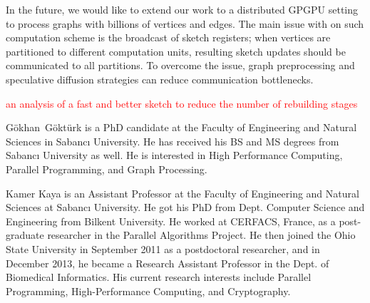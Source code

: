 \documentclass[10pt,journal,compsoc]{IEEEtran}
\newcommand\acro{{\sc{HyperFuseR\xspace}\xspace}\xspace}
\newcommand\kktodo[1]{\textcolor{red}{#1}}
\begin{document}
In the future, we would like to extend our work to a distributed GPGPU setting to process graphs with billions of vertices and edges. The main issue with \acro on such computation scheme is the broadcast of sketch registers; when vertices are partitioned to different computation units, resulting sketch updates should be communicated to all partitions. To overcome the issue, graph preprocessing and speculative diffusion strategies can reduce communication bottlenecks. 

\kktodo{an analysis of a fast and better sketch to reduce the number of rebuilding stages}


\ifCLASSOPTIONcaptionsoff
  \newpage
\fi




\begin{IEEEbiography}{G\"{o}khan~G\"{o}kt\"{u}rk} is a PhD candidate at the Faculty of Engineering and Natural Sciences in Sabancı University. He has received his BS and MS degrees from Sabancı University as well. He is interested in High Performance Computing, Parallel Programming, and Graph Processing.
\end{IEEEbiography}
\begin{IEEEbiography}{Kamer Kaya} is an Assistant Professor at the Faculty of Engineering and Natural Sciences at Sabancı University. He got his PhD from Dept. Computer Science and Engineering from Bilkent University. He worked at CERFACS, France, as a post-graduate researcher in the Parallel Algorithms Project. He then joined the Ohio State University in September 2011 as a postdoctoral researcher, and in December 2013, he became a Research Assistant Professor in the Dept. of Biomedical Informatics.
His current research interests include Parallel Programming, High-Performance Computing, and Cryptography. 
    \end{IEEEbiography}
\end{document}
